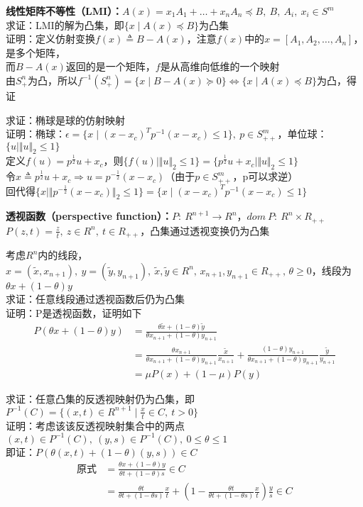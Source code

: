\documentclass[11pt]{ctexart}         %
\begin{document}
\textbf{线性矩阵不等性（LMI）：}$A(x)=x_1A_1+\dots+x_nA_n\preceq B,\ B,\ A_i,\ x_i\in S^m$\\
求证：LMI的解为凸集，即$\{x\mid A(x)\preceq B\}$为凸集\\
证明：定义仿射变换$f(x)\triangleq B-A(x)$，注意$f(x)$中的$x=[A_1,A_2,\dots,A_n]$，是多个矩阵，\\
\phantom{证明：}而$B-A(x)$返回的是一个矩阵，$f$是从高维向低维的一个映射\\
\phantom{证明：}由$S_+^n$为凸，所以$f^{-1}(S_+^n)=\{x\mid B-A(x)\succeq 0\}\Leftrightarrow\{x\mid A(x)\preceq B\}$为凸，得证

求证：椭球是球的仿射映射\\
证明：椭球：$\epsilon=\{x\mid (x-x_c)^Tp^{-1}(x-x_c)\leq 1\},\ p\in S_{++}^m$，单位球：$\{u\mid \Vert u\Vert_2\leq 1\}$\\
\phantom{证明：}定义$f(u)=p^{\frac{1}{2}}u+x_c$，则$\{f(u)\mid \Vert u\Vert_2\leq 1\}=\{p^{\frac{1}{2}}u+x_c\mid \Vert u\Vert_2\leq 1\}$\\
\phantom{证明：}令$x\triangleq p^{\frac{1}{2}}u+x_c\Rightarrow u=p^{-\frac{1}{2}}(x-x_c)$（由于$p\in S_{++}^m$，p可以求逆）\\
\phantom{证明：}回代得$\{x\mid \Vert p^{-\frac{1}{2}}(x-x_c)\Vert_2\leq 1\}=\{x\mid (x-x_c)^Tp^{-1}(x-x_c)\leq 1\}$

\textbf{透视函数（perspective function）：}$P:\ R^{n+1}\to {R^n}$，$dom\ P:\ R^n\times R_{++}$\\$P(z,t)=\frac{z}{t},\ z\in R^n,\ t\in R_{++}$，凸集通过透视变换仍为凸集

考虑$R^n$内的线段，$x=(\tilde{x},x_{n+1}),\ y=(\tilde{y},y_{n+1}),\ \tilde{x},\tilde{y}\in R^n,\,x_{n+1},y_{n+1}\in R_{++},\,\theta\geq 0$，线段为$\theta x+(1-\theta) y$\\
求证：任意线段通过透视函数后仍为凸集\\
证明：P是透视函数，证明如下
\begin{align*}
	P(\theta x+(1-\theta) y)
	&=\frac{\theta \tilde{x}+(1-\theta)\tilde{y}}{\theta x_{n+1}+(1-\theta)y_{n+1}}\\
	&=\frac{\theta x_{n+1}}{\theta x_{n+1}+(1-\theta)y_{n+1}}\frac{\tilde{x}}{x_{n+1}}+\frac{(1-\theta) y_{n+1}}{\theta x_{n+1}+(1-\theta)y_{n+1}}\frac{\tilde{y}}{y_{n+1}}\\
	&=\mu P(x)+(1-\mu)P(y)
\end{align*}

求证：任意凸集的反透视映射仍为凸集，即$P^{-1}(C)=\{(x,t)\in R^{n+1}\mid \frac{x}{t}\in C,\ t>0\}$\\
证明：考虑该该反透视映射集合中的两点$(x,t)\in P^{-1}(C),\ (y,s)\in P^{-1}(C),\ 0\leq \theta\leq 1$\\
\phantom{证明：}即证：$P(\theta (x,t)+(1-\theta)(y,s))\in C$
\begin{align*}
	\text{原式}&=\frac{\theta x+(1-\theta)y}{\theta t+(1-\theta)s}\in C\\
	&=\frac{\theta t}{\theta t+(1-\theta s)}\frac{x}{t}+(1-\frac{\theta t}{\theta t+(1-\theta s)}\frac{x}{t})\frac{y}{s}\in C
\end{align*}
\end{document}

